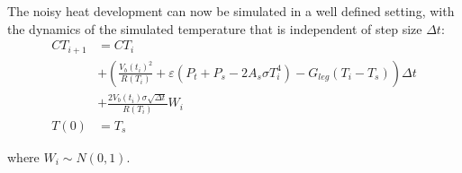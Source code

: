 The noisy heat development can now be simulated
in a well defined setting, with the dynamics of the simulated
temperature that is independent of step size $\Delta t$:
\begin{align} \label{eq:heat_balance_equation_noise_discr}
  CT_{i+1}&=  CT_{i}  \\
            & +
              \left(\frac{V_b(t_{i})^2}{R(T_{i})}+\varepsilon(P_t+P_s
              -2A_s \sigma T_i^4)-G_{leg}(T_i-T_s)\right)\Delta t  \\
  & +  \frac{2 V_b(t_i) \sigma \sqrt{\Delta t}}{R(T_{i})} W_i \\
 T(0)&=T_s	\nonumber
\end{align}

where $W_i \sim N(0,1)$.


